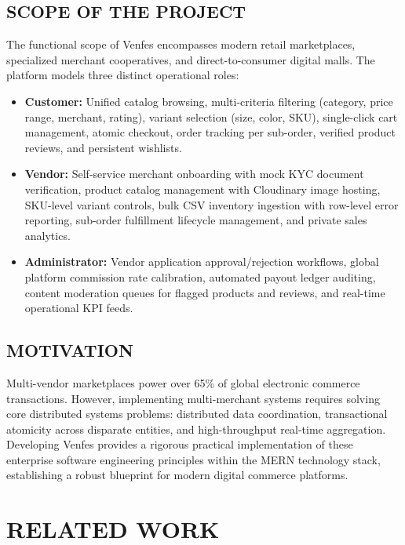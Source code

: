 \documentclass[12pt,a4paper]{report}
\begin{document}
\section{SCOPE OF THE PROJECT}
The functional scope of Venfes encompasses modern retail marketplaces, specialized merchant cooperatives, and direct-to-consumer digital malls. The platform models three distinct operational roles:
\begin{itemize}[leftmargin=1.5cm]
    \item \textbf{Customer:} Unified catalog browsing, multi-criteria filtering (category, price range, merchant, rating), variant selection (size, color, SKU), single-click cart management, atomic checkout, order tracking per sub-order, verified product reviews, and persistent wishlists.
    \item \textbf{Vendor:} Self-service merchant onboarding with mock KYC document verification, product catalog management with Cloudinary image hosting, SKU-level variant controls, bulk CSV inventory ingestion with row-level error reporting, sub-order fulfillment lifecycle management, and private sales analytics.
    \item \textbf{Administrator:} Vendor application approval/rejection workflows, global platform commission rate calibration, automated payout ledger auditing, content moderation queues for flagged products and reviews, and real-time operational KPI feeds.
\end{itemize}

\section{MOTIVATION}
Multi-vendor marketplaces power over 65\% of global electronic commerce transactions. However, implementing multi-merchant systems requires solving core distributed systems problems: distributed data coordination, transactional atomicity across disparate entities, and high-throughput real-time aggregation. Developing Venfes provides a rigorous practical implementation of these enterprise software engineering principles within the MERN technology stack, establishing a robust blueprint for modern digital commerce platforms.

\chapter{RELATED WORK}
\end{document}
